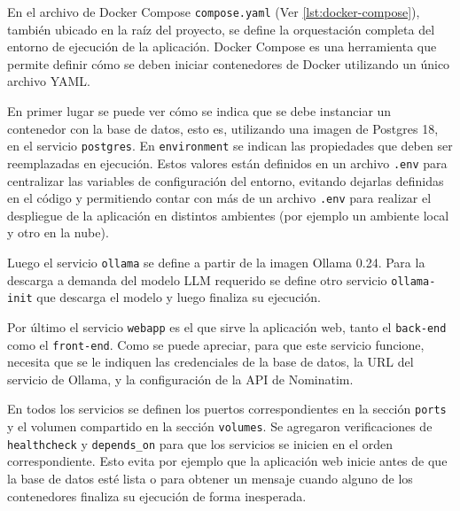 En el archivo de Docker Compose \texttt{compose.yaml} (Ver \autoref{lst:docker-compose}), también ubicado en la raíz del
proyecto, se define la orquestación completa del entorno de ejecución de la aplicación.
Docker Compose es una herramienta que permite definir cómo se deben iniciar contenedores de Docker utilizando un
único archivo YAML\@.

En primer lugar se puede ver cómo se indica que se debe instanciar un contenedor con la base de datos, esto es,
utilizando una imagen de Postgres 18, en el servicio \texttt{postgres}.
En \texttt{environment} se indican las propiedades que deben ser reemplazadas en ejecución.
Estos valores están definidos en un archivo \texttt{.env} para centralizar las variables de configuración del entorno,
evitando dejarlas definidas en el código y permitiendo contar con más de un archivo \texttt{.env} para realizar el
despliegue de la aplicación en distintos ambientes (por ejemplo un ambiente local y otro en la nube).

Luego el servicio \texttt{ollama} se define a partir de la imagen Ollama 0.24.
Para la descarga a demanda del modelo LLM requerido se define otro servicio \texttt{ollama-init} que descarga el modelo
y luego finaliza su ejecución.

Por último el servicio \texttt{webapp} es el que sirve la aplicación web, tanto el \texttt{back-end} como el
\texttt{front-end}.
Como se puede apreciar, para que este servicio funcione, necesita que se le indiquen las credenciales de la base de
datos, la URL del servicio de Ollama, y la configuración de la API de Nominatim.

En todos los servicios se definen los puertos correspondientes en la sección \texttt{ports} y el volumen compartido
en la sección \texttt{volumes}.
Se agregaron verificaciones de \texttt{healthcheck} y \texttt{depends\_on} para que los servicios se inicien en el orden
correspondiente.
Esto evita por ejemplo que la aplicación web inicie antes de que la base de datos esté lista o para obtener un mensaje
cuando alguno de los contenedores finaliza su ejecución de forma inesperada.

